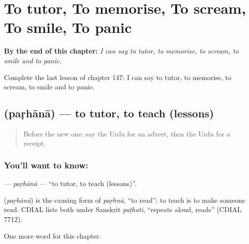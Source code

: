 
\chapter{To tutor, To memorise, To scream, To smile, To panic}
\label{ch:ur-to-tutor-to-memorise-to-scream-to-smile-to-panic}

\begin{chapteropening}
\textbf{By the end of this chapter:} \emph{I can say to tutor, to memorise, to scream, to smile and to panic.}

Complete the last lesson of chapter 147: I can say to tutor, to memorise, to scream, to smile and to panic.
\end{chapteropening}

\section[\texorpdfstring{\ur{پڑھانا} (paṛhānā)}{پڑھانا (paṛhānā)}]{ (paṛhānā) — to tutor, to teach (lessons)}

\label{lesson:UR-C147-parhana}



\begin{quote}
Before the new one: say the Urdu for an advert, then the Urdu for a receipt.
\end{quote}

\subsection*{You'll want to know: }
\textbf{} — \emph{paṛhānā} — \textquotedblleft{}to tutor, to teach (lessons)\textquotedblright{}.

\begin{cousinweb}
\textbf{} (\emph{paṛhānā}) is the causing form of \emph{paṛhnā}, \textquotedblleft{}to read\textquotedblright{}: to teach is to make someone read. CDIAL lists both under Sanskrit \emph{paṭhati}, \textquotedblleft{}repeats aloud, reads\textquotedblright{} (CDIAL 7712).
\end{cousinweb}

\begin{grammarlens}[title={What you've built}]
One more word for this chapter.
\end{grammarlens}

